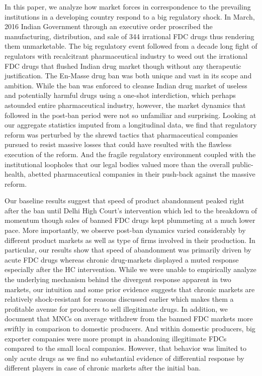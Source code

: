 \documentclass[AER]{AEA}
\theoremstyle{theorem}
\begin{document}
In this paper, we analyze how market forces in correspondence to the prevailing institutions in a developing country respond to a big regulatory shock. In March, 2016 Indian Government through an executive order proscribed the manufacturing, distribution, and sale of 344 irrational FDC drugs thus rendering them unmarketable. The big regulatory event followed from a decade long fight of regulators with recalcitrant pharmaceutical industry to weed out the irrational FDC drugs that flushed Indian drug market though without any therapeutic justification. The En-Masse drug ban was both unique and vast in its scope and ambition. While the ban was enforced to cleanse Indian drug market of useless and potentially harmful drugs using a one-shot interdiction, which perhaps astounded entire pharmaceutical industry, however, the market dynamics that followed in the post-ban period were not so unfamiliar and surprising. Looking at our aggregate statistics imputed from a longitudinal data, we find that regulatory reform was perturbed by the shrewd tactics that pharmaceutical companies pursued to resist massive losses that could have resulted with the flawless execution of the reform. And the fragile regulatory environment coupled with the institutional loopholes that our legal bodies valued more than the overall public-health, abetted pharmaceutical companies in their push-back against the massive reform.

Our baseline results suggest that speed of product abandonment peaked right after the ban until Delhi High Court's intervention which led to the breakdown of momentum though sales of banned FDC drugs kept plummeting at a much lower pace. More importantly, we observe post-ban dynamics varied considerably by different product markets as well as type of firms involved in their production. In particular, our results show that  speed of abandonment was primarily driven by acute FDC drugs whereas chronic drug-markets displayed a muted response especially after the HC intervention. While we were unable to empirically analyze the underlying mechanism behind the divergent response apparent in two markets, our intuition and some prior evidence suggests that chronic markets are relatively shock-resistant for reasons discussed earlier which makes them a profitable avenue for producers to sell illegitimate drugs. In addition, we document that MNCs on average withdrew from the banned FDC markets more swiftly in comparison to domestic producers. And within domestic producers, big exporter companies were more prompt in abandoning illegitimate FDCs compared to the small local companies. However, that behavior was limited to only acute drugs as we find no substantial evidence of differential response by different players in case of chronic markets after the initial ban.
\end{document}
